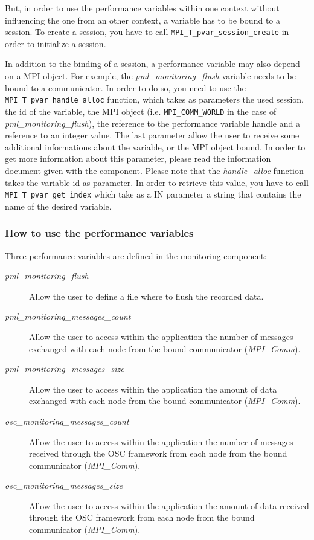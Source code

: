 \documentclass[notitlepage]{article}
\begin{document}
But, in order to use the performance variables within one context
without influencing the one from an other context, a variable has to
be bound to a session. To create a session, you have to call
\texttt{MPI\_T\_pvar\_session\_create} in order to initialize a session.

In addition to the binding of a session, a performance variable may
also depend on a MPI object. For exemple, the
\textit{pml\_monitoring\_flush} variable needs to be bound to a
communicator. In order to do so, you need to use the
\texttt{MPI\_T\_pvar\_handle\_alloc} function, which takes as
parameters the used session, the id of the variable, the MPI object
(i.e. \texttt{MPI\_COMM\_WORLD} in the case of
\textit{pml\_monitoring\_flush}), the reference to the performance
variable handle and a reference to an integer value. The last
parameter allow the user to receive some additional informations
about the variable, or the MPI object bound. In order to get more
information about this parameter, please read the information document
given with the component. Please note that the \textit{handle\_alloc}
function takes the variable id as parameter. In order to retrieve this
value, you have to call \texttt{MPI\_T\_pvar\_get\_index} which take as
a IN parameter a string that contains the name of the desired
variable.

\subsubsection{How to use the performance variables}

Three performance variables are defined in the monitoring component:
\begin{description}
\item [\textit{pml\_monitoring\_flush}] Allow the user to define a file
  where to flush the recorded data.
\item [\textit{pml\_monitoring\_messages\_count}] Allow the user to access
  within the application the number of messages exchanged with each
  node from the bound communicator (\textit{MPI\_Comm}).
\item [\textit{pml\_monitoring\_messages\_size}] Allow the user to access
  within the application the amount of data exchanged with each node
  from the bound communicator (\textit{MPI\_Comm}).
\item [\textit{osc\_monitoring\_messages\_count}] Allow the user to
  access within the application the number of messages received through
  the OSC framework from each node from the bound communicator
  (\textit{MPI\_Comm}).
\item [\textit{osc\_monitoring\_messages\_size}] Allow the user to
  access within the application the amount of data received through the
  OSC framework from each node from the bound communicator
  (\textit{MPI\_Comm}).
\end{description}
\end{document}
